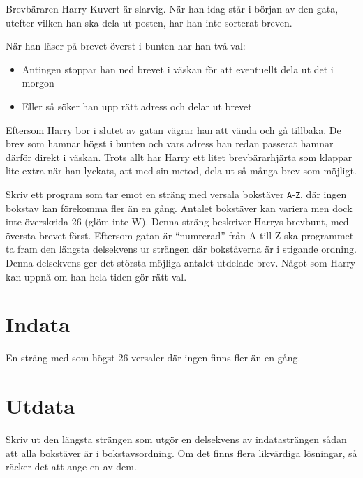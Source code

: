 
Brevbäraren Harry Kuvert är slarvig. När han idag står i början av den gata, utefter vilken han
ska dela ut posten, har han inte sorterat breven.

När han läser på brevet överst i bunten har han två val:
\begin{itemize}
    \item Antingen stoppar han ned brevet i väskan för att eventuellt dela ut det i morgon
    \item Eller så söker han upp rätt adress och delar ut brevet
\end{itemize}

Eftersom Harry bor i slutet av gatan vägrar han att vända och gå tillbaka. De brev som hamnar
högst i bunten och vars adress han redan passerat hamnar därför direkt i väskan.
Trots allt har Harry ett litet brevbärarhjärta som klappar lite extra när han lyckats, att med sin
metod, dela ut så många brev som möjligt.

Skriv ett program som tar emot en sträng med versala bokstäver \texttt{A}-\texttt{Z}, där ingen bokstav
kan förekomma fler än en gång. Antalet bokstäver kan variera men dock inte överskrida 26
(glöm inte W). Denna sträng beskriver Harrys brevbunt, med översta brevet först. Eftersom
gatan är ``numrerad'' från A till Z ska programmet ta fram den längsta delsekvens ur strängen
där bokstäverna är i stigande ordning. Denna delsekvens ger det största möjliga antalet
utdelade brev. Något som Harry kan uppnå om han hela tiden gör rätt val.

\section*{Indata}
En sträng med som högst 26 versaler där ingen finns fler än en gång.


\section*{Utdata}
Skriv ut den längsta strängen som utgör en delsekvens av indatasträngen sådan att alla bokstäver
är i bokstavsordning. Om det finns flera likvärdiga lösningar, så räcker det att ange en av dem.
